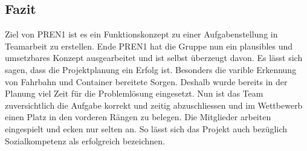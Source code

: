 \subsection{Fazit}

Ziel von PREN1 ist es ein Funktionskonzept zu einer Aufgabenstellung in Teamarbeit zu erstellen. Ende PREN1 hat die Gruppe nun ein plausibles und umsetzbares Konzept ausgearbeitet und ist selbst überzeugt davon. Es lässt sich sagen, dass die Projektplanung ein Erfolg ist. Besonders die varible Erkennung von Fahrbahn und Container bereitete Sorgen. Deshalb wurde bereits in der Planung viel Zeit für die Problemlösung eingesetzt. Nun ist das Team zuversichtlich die Aufgabe korrekt und zeitig abzuschliessen und im Wettbewerb einen Platz in den vorderen Rängen zu belegen. Die Mitglieder arbeiten eingespielt und ecken nur selten an. So lässt sich das Projekt auch bezüglich Sozialkompetenz als erfolgreich bezeichnen. 




